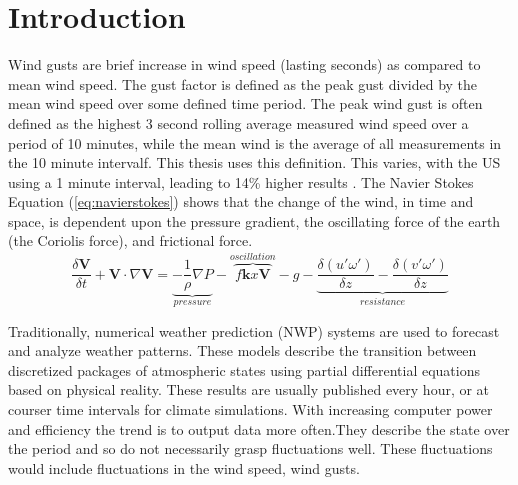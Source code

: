 
\chapter{Introduction} %

\label{Chapter1} %


\newcommand{\keyword}[1]{\textbf{#1}}
\newcommand{\tabhead}[1]{\textbf{#1}}
\newcommand{\code}[1]{\texttt{#1}}
\newcommand{\file}[1]{\texttt{\bfseries#1}}
\newcommand{\option}[1]{\texttt{\itshape#1}}

Wind gusts are brief increase in wind speed (lasting seconds) as compared to mean wind speed. The gust factor is defined as the peak gust divided by the mean wind speed over some defined time period. The peak wind gust is often defined as the highest 3 second rolling average measured wind speed over a period of 10 minutes, while the mean wind is the average of all measurements in the 10 minute intervalf. This thesis uses this definition. This varies, with the US using a 1 minute interval, leading to 14\% higher results \cite{why_wind_gusts}. The Navier Stokes Equation (\ref{eq:navierstokes}) shows that the change of the wind, in time and space, is dependent upon the pressure gradient, the oscillating force of the earth (the Coriolis force), and frictional force.\cite{uncertainties_in_numerical_weather_predictions}
\begin{equation}
    \label{eq:navierstokes}
    \frac{\delta \mathbf{V}}{\delta t} + \mathbf{V}\cdot\nabla\mathbf{V} = \underbrace{-\frac{1}{\rho}\nabla P}_{pressure} -\overbrace{ f\mathbf{k}x\mathbf{V}}^{oscillation} - g - \underbrace{\frac{\delta(u'\omega')}{\delta z} - \frac{\delta(v'\omega')}{\delta z}}_{resistance}
\end{equation}

Traditionally, numerical weather prediction (NWP) systems are used to forecast and analyze weather patterns\cite{medium_range_3d_weather_forecasting_NN}. These models describe the transition between discretized packages of atmospheric states using partial differential equations based on physical reality. These results are usually published every hour, or at courser time intervals for climate simulations. With increasing computer power and efficiency the trend is to output data more often\cite{GNP_vidtal}.They describe the state over the period and so do not necessarily grasp fluctuations well. These fluctuations would include fluctuations in the wind speed, wind gusts\cite{canNNBeatNWP}.

